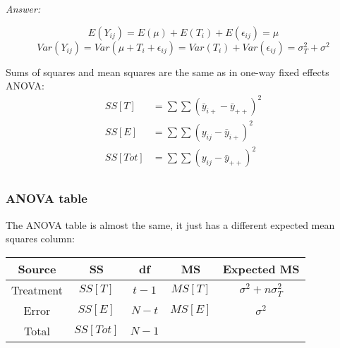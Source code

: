 {\it Answer:}\\
\begin{pf}
$$
\textit{E}(Y_{ij}) = \textit{E}(\mu) + \textit{E}(T_i) + \textit{E}(\epsilon_{ij})  = \mu
$$
$$
\textit{Var}(Y_{ij}) = \textit{Var}(\mu + T_i + \epsilon_{ij}) = \textit{Var}(T_i) + \textit{Var}(\epsilon_{ij}) = \sigma_T^2 + \sigma^2
$$
\end{pf}

Sums of squares and mean squares are the same as in one-way fixed effects ANOVA:
$$
\begin{aligned}
	SS[T] &= \sum\sum(\bar{y}_{i+} - \bar{y}_{++})^2\\
	SS[E] &= \sum\sum({y}_{ij} - \bar{y}_{i+})^2\\
	SS[Tot] &= \sum\sum({y}_{ij} - \bar{y}_{++})^2\\
\end{aligned}
$$

\subsubsection*{ANOVA table}
The ANOVA table is almost the same, it just has a different expected mean squares column:
\begin{table}[H]
	\renewcommand{\arraystretch}{1.5}
	\centering
	\begin{tabular}{ccccc}
		\toprule
		Source & SS & df & MS & Expected MS \\
		\hline
		Treatment & $SS[T]$ & $t - 1$ & $MS[T]$ & $\sigma^2 + n\sigma^2_T$\\
		Error & $SS[E]$ & $N - t$ & $MS[E]$ & $\sigma^2$\\
		Total & $SS[Tot]$ & $N - 1$ &  &\\
		\bottomrule
	\end{tabular}
\end{table}

